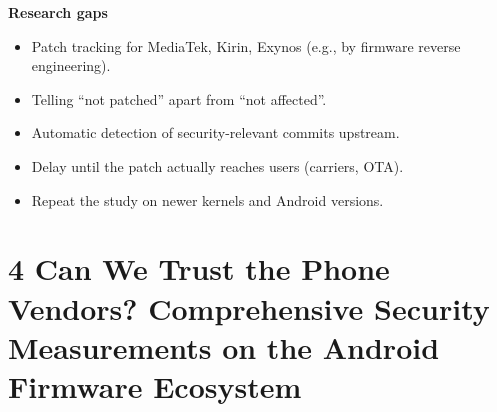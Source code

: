 \documentclass[11pt,a4paper]{article}
\begin{document}
\begin{enumerate}
    \vspace{4pt}
    \textbf{Research gaps}
    \begin{itemize}
        \item Patch tracking for MediaTek, Kirin, Exynos (e.g., by firmware reverse engineering).
        \item Telling ``not patched'' apart from ``not affected''.
        \item Automatic detection of security-relevant commits upstream.
        \item Delay until the patch actually reaches users (carriers, OTA).
        \item Repeat the study on newer kernels and Android versions.
    \end{itemize}

\end{enumerate}

\newpage

\section{4 Can We Trust the Phone Vendors? Comprehensive Security Measurements on the Android Firmware Ecosystem}
\end{document}
